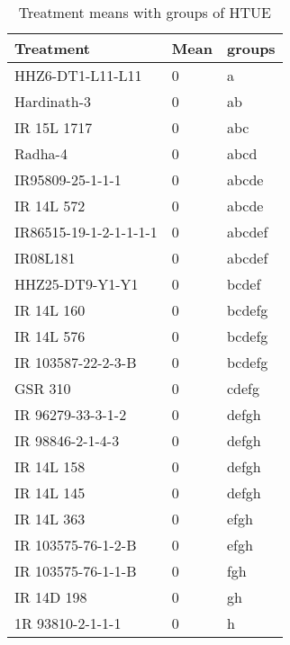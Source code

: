 \documentclass[]{article}
\begin{document}
\begin{longtable}{lll}
\caption{\label{tab:two-fac-groups-tab-agroclimate-early}Treatment means with groups of HTUE}\\
\toprule
Treatment & Mean & groups\\
\midrule
\rowcolor{gray!6}  HHZ6-DT1-L11-L11 & 0 & a\\
Hardinath-3 & 0 & ab\\
\rowcolor{gray!6}  IR 15L 1717 & 0 & abc\\
Radha-4 & 0 & abcd\\
\rowcolor{gray!6}  IR95809-25-1-1-1 & 0 & abcde\\
\addlinespace
IR 14L 572 & 0 & abcde\\
\rowcolor{gray!6}  IR86515-19-1-2-1-1-1-1 & 0 & abcdef\\
IR08L181 & 0 & abcdef\\
\rowcolor{gray!6}  HHZ25-DT9-Y1-Y1 & 0 & bcdef\\
IR 14L 160 & 0 & bcdefg\\
\addlinespace
\rowcolor{gray!6}  IR 14L 576 & 0 & bcdefg\\
IR 103587-22-2-3-B & 0 & bcdefg\\
\rowcolor{gray!6}  GSR 310 & 0 & cdefg\\
IR 96279-33-3-1-2 & 0 & defgh\\
\rowcolor{gray!6}  IR 98846-2-1-4-3 & 0 & defgh\\
\addlinespace
IR 14L 158 & 0 & defgh\\
\rowcolor{gray!6}  IR 14L 145 & 0 & defgh\\
IR 14L 363 & 0 & efgh\\
\rowcolor{gray!6}  IR 103575-76-1-2-B & 0 & efgh\\
IR 103575-76-1-1-B & 0 & fgh\\
\addlinespace
\rowcolor{gray!6}  IR 14D 198 & 0 & gh\\
1R 93810-2-1-1-1 & 0 & h\\
\bottomrule
\end{longtable}
\endgroup{}
\begingroup\fontsize{12}{14}\selectfont
\end{document}
